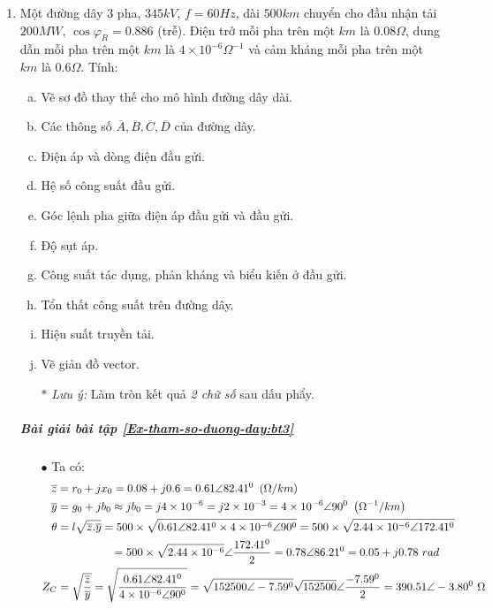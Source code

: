 \begin{enumerate}
		\item \label{Ex-tham-so-duong-day:bt3} Một đường dây 3 pha, $345 \unit{kV}$, $f=60Hz$, dài $500 \unit{km}$ chuyển cho đầu nhận tải $200 \unit{MW}$, $\cos \varphi_R = 0.886$ (trễ). Điện trở mỗi pha trên một $km$ là $0.08 \unit{\Omega}$,  dung dẫn mỗi pha trên một $km$ là $4 \times 10^{-6} \unit{\Omega^{-1}}$ và cảm kháng mỗi pha trên một $km$ là $0.6 \unit{\Omega}$. Tính:
			\begin{enumerate}[a.]
				\item Vẽ sơ đồ thay thế cho mô hình đường dây dài.
				\item Các thông số $\overline{A}, \overline{B}, \overline{C}, \overline{D}$ của đường dây.
				\item Điện áp và dòng điện đầu gửi.
				\item Hệ số công suất đầu gửi.
				\item Góc lệnh pha giữa điện áp đầu gửi và đầu gửi.
				\item Độ sụt áp.
				\item Công suất tác dụng, phản kháng và biểu kiến ở đầu gửi.
				\item Tổn thất công suất trên đường dây.
				\item Hiệu suất truyền tải.
				\item Vẽ giản đồ vector.
				\item[$\ast$] \emph{Lưu ý:} Làm tròn kết quả \emph{2 chữ số} sau dấu phẩy.
			\end{enumerate}
			
		\subparagraph{Bài giải bài tập \ref{Ex-tham-so-duong-day:bt3}}
			\begin{enumerate}[\it a.]
				\item[$\bullet$] Ta có:
					\begin{align*}
						\overline{z} & = r_0 + j x_0 = 0.08 +j 0.6 = 0.61 \angle 82.41^0~\left({\Omega/km}\right)\\
						\overline{y} & = g_0 + j b_0 \approx j b_0 = j 4 \times 10^{-6} = j 2 \times 10^{-3} = 4 \times 10^{-6} \angle 90^0 ~\left({\Omega^{-1}/km}\right)\\
						\theta & = l\sqrt{\overline{z}.\overline{y}} = 500 \times \sqrt{0.61 \angle 82.41^0 \times 4 \times 10^{-6} \angle 90^0} = 500 \times \sqrt{2.44 \times 10^{-6} \angle 172.41^0}\\
						& \hspace{1.7cm}= 500 \times \sqrt{2.44 \times 10^{-6}} \angle \dfrac{172.41^0}{2} = 0.78 \angle 86.21^0 = 0.05 + j0.78 ~rad\\
						Z_C & = \sqrt{\dfrac{\overline{z}}{\overline{y}}} =  \sqrt{\dfrac{0.61 \angle 82.41^0}{4 \times 10^{-6} \angle 90^0}} =  \sqrt{152500 \angle -7.59^0} \sqrt{152500} \angle \dfrac{ -7.59^0}{2} = 390.51 \angle -3.80^0 ~\Omega	
					\end{align*}
					

\end{enumerate}
\end{enumerate}
